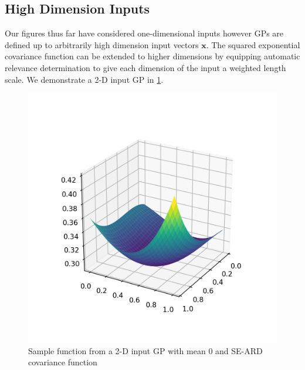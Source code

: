 \documentclass[10pt,a4paper]{article}
\numberwithin{equation}{section}
\theoremstyle{plain}
\theoremstyle{definition}
\theoremstyle{own}
\begin{document}
\subsection{High Dimension Inputs}
Our figures thus far have considered one-dimensional inputs however GPs are defined up to arbitrarily high dimension input vectors $\mathbf{x}$. The squared exponential covariance function can be extended to higher dimensions by equipping automatic relevance determination to give each dimension of the input a weighted length scale. We demonstrate a 2-D input GP in \cref{fig:2d}.
\begin{figure}[H]
\begin{center}
\begin{minipage}{0.49\textwidth}
\begin{center}
\includegraphics[width=1.0\textwidth]{hyper_2d}
\end{center}
\caption{Sample function from a 2-D input GP with mean 0 and SE-ARD covariance function}
\label{fig:2d}
\end{minipage}
\begin{minipage}{0.49\textwidth}
\begin{center}

\end{center}
\end{minipage}
\end{center}
\end{figure}
\end{document}
